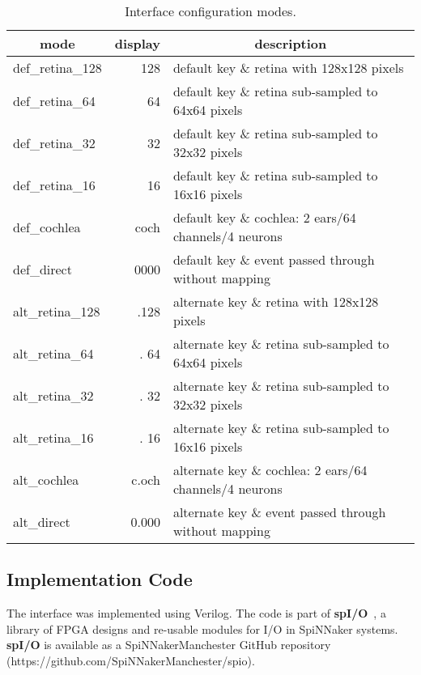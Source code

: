 \begin{table}[!ht]
\begin{center}
\begin{tabular}{| l | r | l |}
\hline
\multicolumn{1}{|c}{mode}  & \multicolumn{1}{|c|}{display} & \multicolumn{1}{|c|}{description} \\
\hline
def\_retina\_128 &  128  & default key \& retina with 128x128 pixels \\
def\_retina\_64  &   64  & default key \& retina sub-sampled to 64x64 pixels \\
def\_retina\_32  &   32  & default key \& retina sub-sampled to 32x32 pixels \\
def\_retina\_16  &   16  & default key \& retina sub-sampled to 16x16 pixels \\
\hline
def\_cochlea     & coch  & default key \& cochlea: 2 ears/64 channels/4 neurons\\
\hline
def\_direct      & 0000  & default key \& event passed through without mapping \\
\hline
alt\_retina\_128 & .128  & alternate key \& retina with 128x128 pixels \\
alt\_retina\_64  & . 64  & alternate key \& retina sub-sampled to 64x64 pixels \\
alt\_retina\_32  & . 32  & alternate key \& retina sub-sampled to 32x32 pixels \\
alt\_retina\_16  & . 16  & alternate key \& retina sub-sampled to 16x16 pixels \\
\hline
alt\_cochlea     & c.och & alternate key \& cochlea: 2 ears/64 channels/4 neurons\\
\hline
alt\_direct      & 0.000 & alternate key \& event passed through without mapping \\
\hline
\end{tabular}
\caption{Interface configuration modes.}
\label{tab:modes}
\end{center}
\end{table}




\subsection{Implementation Code}


The interface was implemented using Verilog. The code is part of
\textbf{spI/O}~\cite{spio2014}, a library of FPGA designs and re-usable modules for I/O in SpiNNaker systems. \textbf{spI/O} is available as a
SpiNNakerManchester GitHub repository
(https://github.com/SpiNNakerManchester/spio).



